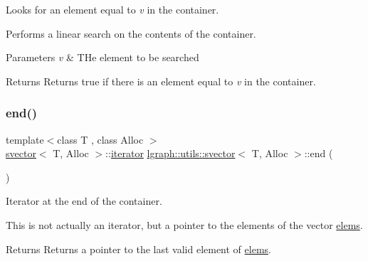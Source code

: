Looks for an element equal to {\itshape v} in the container. 

Performs a linear search on the contents of the container.


\begin{DoxyParams}{Parameters}
{\em v} & T\+He element to be searched \\
\hline
\end{DoxyParams}
\begin{DoxyReturn}{Returns}
Returns true if there is an element equal to {\itshape v} in the container. 
\end{DoxyReturn}
\mbox{\label{classlgraph_1_1utils_1_1svector_a07bc452bc6022b65a0399de60b600565}} 
\subsubsection{\texorpdfstring{end()}{end()}\hspace{0.1cm}{\footnotesize\ttfamily [1/2]}}
{\footnotesize\ttfamily template$<$class T , class Alloc $>$ \\
\hyperlink{classlgraph_1_1utils_1_1svector}{svector}$<$ T, Alloc $>$\+::\hyperlink{classlgraph_1_1utils_1_1svector_a518288794e754e27d2e2274ced4485a6}{iterator} \hyperlink{classlgraph_1_1utils_1_1svector}{lgraph\+::utils\+::svector}$<$ T, Alloc $>$\+::end (\begin{DoxyParamCaption}{ }\end{DoxyParamCaption})}



Iterator at the end of the container. 

This is not actually an iterator, but a pointer to the elements of the vector \hyperlink{classlgraph_1_1utils_1_1svector_aa72e9ffeb58f88d3cb01671e3e672a45}{elems}. \begin{DoxyReturn}{Returns}
Returns a pointer to the last valid element of \hyperlink{classlgraph_1_1utils_1_1svector_aa72e9ffeb58f88d3cb01671e3e672a45}{elems}. 
\end{DoxyReturn}
\mbox{\label{classlgraph_1_1utils_1_1svector_a4613e678ccd2f35d91dcf6413f524e61}} 
